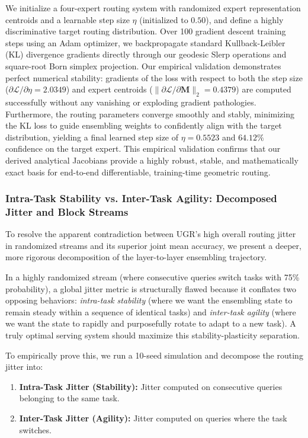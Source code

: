 We initialize a four-expert routing system with randomized expert representation centroids and a learnable step size $\eta$ (initialized to $0.50$), and define a highly discriminative target routing distribution. Over 100 gradient descent training steps using an Adam optimizer, we backpropagate standard Kullback-Leibler (KL) divergence gradients directly through our geodesic Slerp operations and square-root Born simplex projection. Our empirical validation demonstrates perfect numerical stability: gradients of the loss with respect to both the step size ($\partial \mathcal{L} / \partial \eta = 2.0349$) and expert centroids ($\|\partial \mathcal{L} / \partial \mathbf{M}\|_2 = 0.4379$) are computed successfully without any vanishing or exploding gradient pathologies. Furthermore, the routing parameters converge smoothly and stably, minimizing the KL loss to guide ensembling weights to confidently align with the target distribution, yielding a final learned step size of $\eta = 0.5523$ and $64.12\%$ confidence on the target expert. This empirical validation confirms that our derived analytical Jacobians provide a highly robust, stable, and mathematically exact basis for end-to-end differentiable, training-time geometric routing.

\subsubsection{Intra-Task Stability vs. Inter-Task Agility: Decomposed Jitter and Block Streams}
\label{subsubsec:decomposed_jitter}
To resolve the apparent contradiction between UGR's high overall routing jitter in randomized streams and its superior joint mean accuracy, we present a deeper, more rigorous decomposition of the layer-to-layer ensembling trajectory. 

In a highly randomized stream (where consecutive queries switch tasks with 75\% probability), a global jitter metric is structurally flawed because it conflates two opposing behaviors: \emph{intra-task stability} (where we want the ensembling state to remain steady within a sequence of identical tasks) and \emph{inter-task agility} (where we want the state to rapidly and purposefully rotate to adapt to a new task). A truly optimal serving system should maximize this stability-plasticity separation.

To empirically prove this, we run a 10-seed simulation and decompose the routing jitter into:
\begin{enumerate}
    \item \textbf{Intra-Task Jitter (Stability):} Jitter computed on consecutive queries belonging to the same task.
    \item \textbf{Inter-Task Jitter (Agility):} Jitter computed on queries where the task switches.
\end{enumerate}

